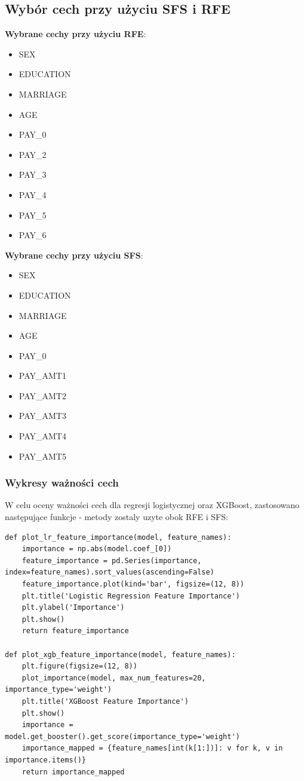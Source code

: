 \documentclass{article}
\begin{document}
\subsection{Wybór cech przy użyciu SFS i RFE}
\textbf{Wybrane cechy przy użyciu RFE}:
\begin{itemize}
    \item SEX
    \item EDUCATION
    \item MARRIAGE
    \item AGE
    \item PAY\_0
    \item PAY\_2
    \item PAY\_3
    \item PAY\_4
    \item PAY\_5
    \item PAY\_6
\end{itemize}

\textbf{Wybrane cechy przy użyciu SFS}:
\begin{itemize}
    \item SEX
    \item EDUCATION
    \item MARRIAGE
    \item AGE
    \item PAY\_0
    \item PAY\_AMT1
    \item PAY\_AMT2
    \item PAY\_AMT3
    \item PAY\_AMT4
    \item PAY\_AMT5
\end{itemize}

\subsubsection{Wykresy ważności cech}

W celu oceny ważności cech dla regresji logistycznej oraz XGBoost, zastosowano następujące funkcje - metody zostaly uzyte obok RFE i SFS:

\begin{verbatim}
def plot_lr_feature_importance(model, feature_names):
    importance = np.abs(model.coef_[0])
    feature_importance = pd.Series(importance, index=feature_names).sort_values(ascending=False)
    feature_importance.plot(kind='bar', figsize=(12, 8))
    plt.title('Logistic Regression Feature Importance')
    plt.ylabel('Importance')
    plt.show()
    return feature_importance

def plot_xgb_feature_importance(model, feature_names):
    plt.figure(figsize=(12, 8))
    plot_importance(model, max_num_features=20, importance_type='weight')
    plt.title('XGBoost Feature Importance')
    plt.show()
    importance = model.get_booster().get_score(importance_type='weight')
    importance_mapped = {feature_names[int(k[1:])]: v for k, v in importance.items()}
    return importance_mapped
\end{verbatim}
\end{document}
